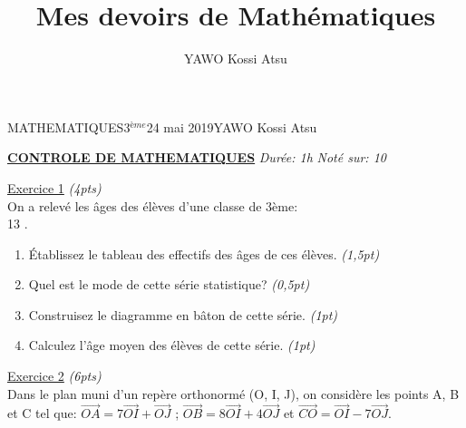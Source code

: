 \documentclass[12pt,a4paper]{book}
\author{YAWO Kossi Atsu}
\title{Mes devoirs de Mathématiques}
\newcommand{\prof}{YAWO Kossi Atsu}
\newcommand{\matiere}{MATHEMATIQUES}
\newcommand{\classe}{3$^{ème}$}
\begin{document}
\begin{td}{\matiere}{\classe}{24 mai 2019}{\prof}
\end{td}

\newpage
\textbf{\underline{CONTROLE DE \matiere}}  \qquad \qquad  \qquad \qquad \emph{Durée: 1h} \qquad \qquad \emph{Noté sur: 10} \\
\par
\underline{Exercice 1} \emph{(4pts)}\\
On a relevé les âges des élèves d'une classe de 3ème:\\
13                                       .
\begin{enumerate}
\item Établissez le tableau des effectifs des âges de ces élèves. \emph{(1,5pt)}
\item Quel est le mode de cette série statistique? \emph{(0,5pt)}
\item Construisez le diagramme en bâton de cette série. \emph{(1pt)}
\item Calculez l'âge moyen des élèves de cette série. \emph{(1pt)}
\end{enumerate}
\vspace{0,5cm}
\underline{Exercice 2} \emph{(6pts)} \\
Dans le plan muni d'un repère orthonormé (O, I, J), on considère les points A, B et C tel que: $\overrightarrow{OA}=7\overrightarrow{OI}+\overrightarrow{OJ}$ ; $\overrightarrow{OB}=8\overrightarrow{OI}+4\overrightarrow{OJ}$ et $\overrightarrow{CO}=\overrightarrow{OI}-7\overrightarrow{OJ}$.
\end{document}
